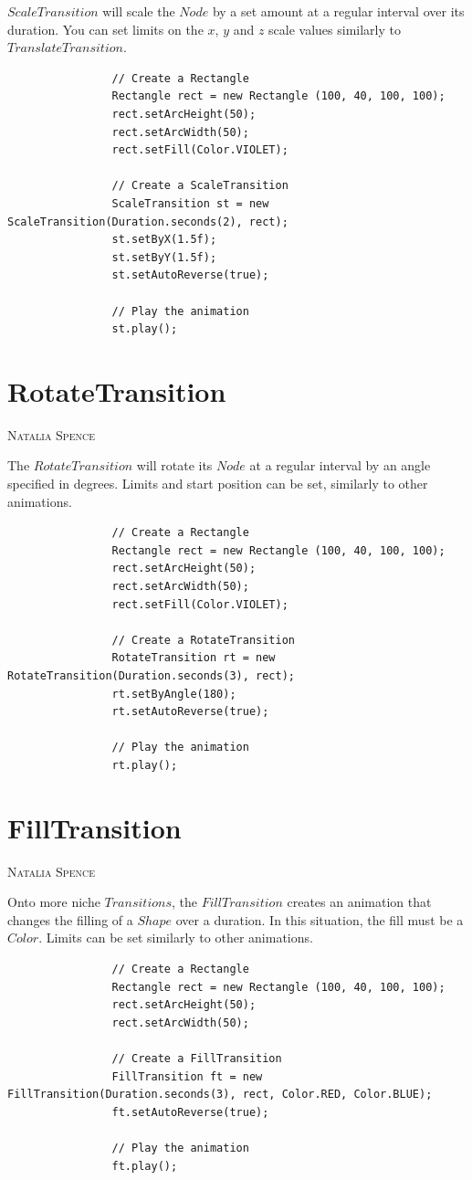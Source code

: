 \documentclass[a4paper]{report}
\makeatletter
\newcommand{\sectionauthor}[1]{%
	{\parindent0pt\vspace*{0pt}%
		\linespread{1.1}\large\scshape#1%
		\par\nobreak\vspace*{10pt}}
	\@afterheading%
}
\makeatother
\begin{document}
			$ScaleTransition$ will scale the $Node$ by a set amount at a regular interval over its duration. You can set limits on the $x$, $y$ and $z$ scale values similarly to $TranslateTransition$.
			
			\begin{lstlisting}
				// Create a Rectangle
				Rectangle rect = new Rectangle (100, 40, 100, 100);
				rect.setArcHeight(50);
				rect.setArcWidth(50);
				rect.setFill(Color.VIOLET);
				
				// Create a ScaleTransition
				ScaleTransition st = new ScaleTransition(Duration.seconds(2), rect);
				st.setByX(1.5f);
				st.setByY(1.5f);
				st.setAutoReverse(true);
				
				// Play the animation
				st.play();
			\end{lstlisting}
		
		\section{RotateTransition}\label{sec:rotate transition}
		\sectionauthor{Natalia Spence}
		
			The $RotateTransition$ will rotate its $Node$ at a regular interval by an angle specified in degrees. Limits and start position can be set, similarly to other animations.
		
			\begin{lstlisting}
				// Create a Rectangle
				Rectangle rect = new Rectangle (100, 40, 100, 100);
				rect.setArcHeight(50);
				rect.setArcWidth(50);
				rect.setFill(Color.VIOLET);
				
				// Create a RotateTransition
				RotateTransition rt = new RotateTransition(Duration.seconds(3), rect);
				rt.setByAngle(180);
				rt.setAutoReverse(true);
				
				// Play the animation
				rt.play();
			\end{lstlisting}
		
		\section{FillTransition}\label{sec:fill transition}
		\sectionauthor{Natalia Spence}
		
			Onto more niche $Transitions$, the $FillTransition$ creates an animation that changes the filling of a $Shape$ over a duration. In this situation, the fill must be a $Color$. Limits can be set similarly to other animations.
			
			\begin{lstlisting}
				// Create a Rectangle
				Rectangle rect = new Rectangle (100, 40, 100, 100);
				rect.setArcHeight(50);
				rect.setArcWidth(50);
				
				// Create a FillTransition
				FillTransition ft = new FillTransition(Duration.seconds(3), rect, Color.RED, Color.BLUE);
				ft.setAutoReverse(true);
				
				// Play the animation
				ft.play();
			\end{lstlisting}
		
\end{document}
